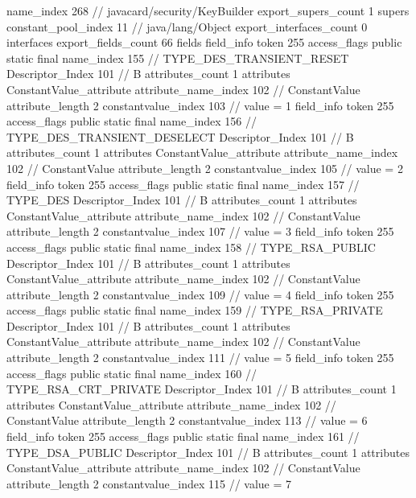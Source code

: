 {{{			name_index	268		// javacard/security/KeyBuilder
			export_supers_count	1
			supers {
				constant_pool_index	11		// java/lang/Object
			}
			export_interfaces_count	0
			interfaces {
			}
			export_fields_count	66
			fields {
			field_info {
				token	255
				access_flags	public static final
				name_index	155		// TYPE_DES_TRANSIENT_RESET
				Descriptor_Index	101		// B
				attributes_count	1
				attributes {
				ConstantValue_attribute {
					attribute_name_index	102		// ConstantValue
					attribute_length	2
					constantvalue_index	103		// value = 1
				}
				}
			}
			field_info {
				token	255
				access_flags	public static final
				name_index	156		// TYPE_DES_TRANSIENT_DESELECT
				Descriptor_Index	101		// B
				attributes_count	1
				attributes {
				ConstantValue_attribute {
					attribute_name_index	102		// ConstantValue
					attribute_length	2
					constantvalue_index	105		// value = 2
				}
				}
			}
			field_info {
				token	255
				access_flags	public static final
				name_index	157		// TYPE_DES
				Descriptor_Index	101		// B
				attributes_count	1
				attributes {
				ConstantValue_attribute {
					attribute_name_index	102		// ConstantValue
					attribute_length	2
					constantvalue_index	107		// value = 3
				}
				}
			}
			field_info {
				token	255
				access_flags	public static final
				name_index	158		// TYPE_RSA_PUBLIC
				Descriptor_Index	101		// B
				attributes_count	1
				attributes {
				ConstantValue_attribute {
					attribute_name_index	102		// ConstantValue
					attribute_length	2
					constantvalue_index	109		// value = 4
				}
				}
			}
			field_info {
				token	255
				access_flags	public static final
				name_index	159		// TYPE_RSA_PRIVATE
				Descriptor_Index	101		// B
				attributes_count	1
				attributes {
				ConstantValue_attribute {
					attribute_name_index	102		// ConstantValue
					attribute_length	2
					constantvalue_index	111		// value = 5
				}
				}
			}
			field_info {
				token	255
				access_flags	public static final
				name_index	160		// TYPE_RSA_CRT_PRIVATE
				Descriptor_Index	101		// B
				attributes_count	1
				attributes {
				ConstantValue_attribute {
					attribute_name_index	102		// ConstantValue
					attribute_length	2
					constantvalue_index	113		// value = 6
				}
				}
			}
			field_info {
				token	255
				access_flags	public static final
				name_index	161		// TYPE_DSA_PUBLIC
				Descriptor_Index	101		// B
				attributes_count	1
				attributes {
				ConstantValue_attribute {
					attribute_name_index	102		// ConstantValue
					attribute_length	2
					constantvalue_index	115		// value = 7
}}}}}}}
